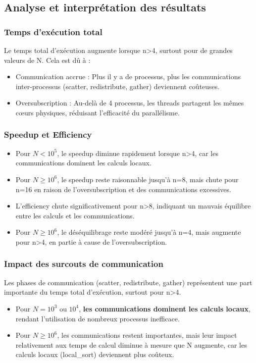 \documentclass[a4paper,13pt]{book}
\begin{document}
\subsection{Analyse  et interprétation des résultats}
\subsubsection{Temps d'exécution total} Le temps total d'exécution augmente lorsque n>4, surtout pour de grandes valeurs de N. Cela est dû à : 
\begin{itemize}
  \item Communication accrue : Plus il y a de processus, plus les communications inter-processus (scatter, redistribute, gather) deviennent coûteuses.
  \item Oversubscription  : Au-delà de 4 processus, les threads partagent les mêmes cœurs physiques, réduisant l'efficacité du parallélisme.
\end{itemize}
\subsubsection{Speedup et Efficiency}
\begin{itemize}
  \item Pour $N<10^5$, le speedup diminue rapidement lorsque n>4, car les communications dominent les calculs locaux.
  \item Pour $N\geq 10^6$, le speedup reste raisonnable jusqu'à n=8, mais chute pour n=16 en raison de l'oversubscription et des communications excessives.
  \item L'efficiency chute significativement pour n>8, indiquant un mauvais équilibre entre les calculs et les communications.
  \item Pour $N\geq 10^6$, le déséquilibrage reste modéré jusqu'à n=4, mais augmente pour n>4, en partie à cause de l'oversubscription.
\end{itemize}
\subsubsection{Impact des surcouts de communication}
Les phases de communication (scatter, redistribute, gather) représentent une part importante du temps total d'exécution, surtout pour n>4.
\begin{itemize}
  \item Pour $N=10^3$ ou $10^4$, \textbf{les communications dominent les calculs locaux}, rendant l'utilisation de nombreux processus inefficace.
  \item Pour $N\geq 10^6$, les communications restent importantes, mais leur impact relativement aux temps de calcul diminue à mesure que N augmente, car les calculs locaux (local\_sort) deviennent plus coûteux.
\end{itemize}
\end{document}
